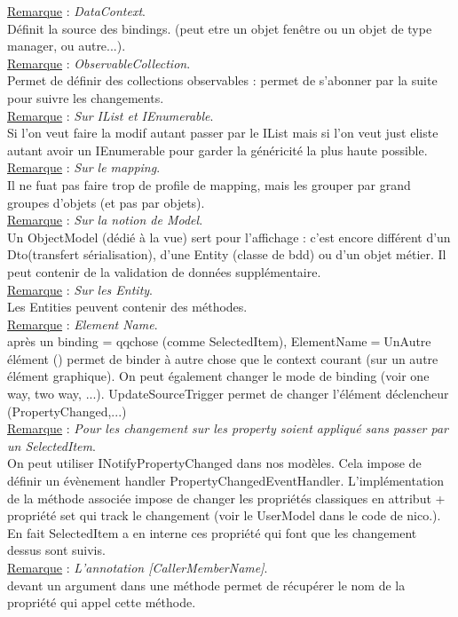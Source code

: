 \documentclass[a4paper,12pt,twoside]{article}
\newcommand{\incode}[1]{{\footnotesize\ttfamily #1}} %
\newcommand{\rem}[2]{\noindent\underline{Remarque} : \textit{#1}.\\ \indent #2}
\begin{document}
\rem{DataContext}{Définit la source des bindings. (peut etre un objet fenêtre ou un objet de type manager, ou autre...).}\\

\rem{ObservableCollection}{Permet de définir des collections observables : permet de s'abonner par la suite pour suivre les changements.}\\

\rem{Sur IList et IEnumerable}{Si l'on veut faire la modif autant passer par le IList mais si l'on veut just eliste autant avoir un IEnumerable pour garder la généricité la plus haute possible.}\\

\rem{Sur le mapping}{Il ne fuat pas faire trop de profile de mapping, mais les grouper par grand groupes d'objets (et pas par objets).}\\

\rem{Sur la notion de Model}{ Un ObjectModel (dédié à la vue) sert pour l'affichage : c'est encore différent d'un Dto(transfert sérialisation), d'une Entity (classe de bdd) ou d'un objet métier. Il peut contenir de la validation de données supplémentaire.}\\

\rem{Sur les Entity}{Les Entities peuvent contenir des méthodes.}\\

\rem{Element Name}{après un binding = qqchose (comme SelectedItem), ElementName$=$UnAutre élément () permet de binder à autre chose que le context courant (sur un autre élément graphique). On peut également changer le \incode{mode} de binding (voir one way, two way, ...). \incode{UpdateSourceTrigger} permet de changer l'élément déclencheur (PropertyChanged,...)}\\

\rem{Pour les changement sur les property soient appliqué sans passer par un SelectedItem}{On peut utiliser INotifyPropertyChanged dans nos modèles. Cela impose de définir un évènement handler PropertyChangedEventHandler. L'implémentation de la méthode associée impose de changer les propriétés classiques en attribut + propriété set qui track le changement (voir le UserModel dans le code de nico.). En fait SelectedItem a en interne ces propriété qui font que les changement dessus sont suivis.}\\

\rem{L'annotation [CallerMemberName]}{devant un argument dans une méthode permet de récupérer le nom de la propriété qui appel cette méthode.}\\
\end{document}

